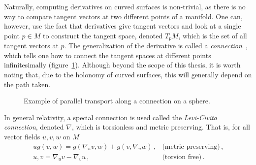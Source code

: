 Naturally, computing derivatives on curved surfaces is non-trivial, as there is no way to compare tangent vectors at two different points of a manifold. One can, however, use the fact that derivatives give tangent vectors and look at a single point $p\in M$ to construct the tangent space, denoted $T_pM$, which is the set of all tangent vectors at $p$. The generalization of the derivative is called a \textit{connection}~\cite{baez_john_gauge_1994}, which tells one how to connect the tangent spaces at different points infinitesimally (figure~\ref{fig:parallel_transport}). Although beyond the scope of this thesis, it is worth noting that, due to the holonomy of curved surfaces, this will generally depend on the path taken.
\begin{figure}
    \centering
    \caption{Example of parallel transport along a connection on a sphere. }
    \label{fig:parallel_transport}
\end{figure}
In general relativity, a special connection is used called the \textit{Levi-Civita connection}, denoted $\nabla$, which is torsionless and metric preserving. That is, for all vector fields $u,v,w$ on $M$
\begin{equation}
    \begin{array}{lr}
        u g(v,w) = g(\nabla_u v, w)+g(v,\nabla_u w) \,, & \text{(metric preserving)} \,, \\
        u,v = \nabla_u v - \nabla_v u \,, & \text{(torsion free)}\,. \\
    \end{array}
\end{equation}

